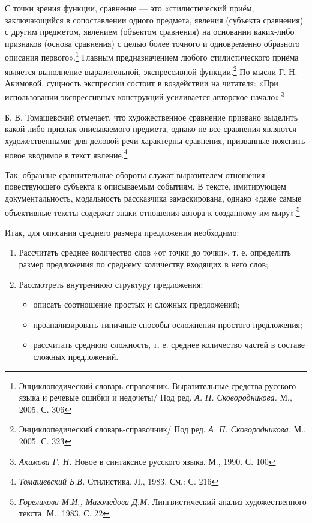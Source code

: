 \documentclass{kursa4}
\begin{document}
      С точки зрения функции, сравнение — это «стилистический приём, заключающийся в сопоставлении одного предмета, явления (субъекта сравнения) с другим предметом, явлением (объектом сравнения) на основании каких-либо признаков (основа сравнения) с целью более точного и одновременно образного описания первого».\footnote{Энциклопедический словарь-справочник. Выразительные средства русского языка и речевые ошибки и недочеты/ Под ред. \textit{А. П. Сковородникова.} М., 2005. С. 306} Главным предназначением любого стилистического приёма является выполнение выразительной, экспрессивной функции.\footnote{Энциклопедический словарь-справочник/ Под ред. \textit{А. П. Сковородникова.} М., 2005. С. 323} По мысли Г. Н. Акимовой, сущность экспрессии  состоит в воздействии на читателя: «При использовании экспрессивных конструкций усиливается авторское начало».\footnote{\textit{Акимова Г. Н.} Новое в синтаксисе русского языка. М., 1990. С. 100} 

      Б. В. Томашевский отмечает, что художественное сравнение призвано выделить какой-либо признак описываемого предмета, однако не все сравнения являются художественными: для деловой речи характерны сравнения, призванные  пояснить новое вводимое в текст явление.\footnote{\textit{Томашевский Б.В.} Стилистика. Л., 1983. См.: С. 216} 

      Так, образные сравнительные обороты служат выразителем отношения повествующего субъекта к описываемым событиям. В тексте, имитирующем документальность, модальность рассказчика замаскирована, однако «даже самые объективные тексты содержат знаки отношения автора к созданному им миру».\footnote{\textit{Гореликова М.И., Магомедова Д.М.} Лингвистический анализ художественного текста. М., 1983. С. 22}  

      Итак, для описания среднего размера предложения необходимо: 
      \begin{enumerate}
        \item Рассчитать среднее количество слов «от точки до точки», т. е. определить размер предложения по среднему количеству входящих в него слов; \item Рассмотреть внутреннюю структуру предложения: 
        \begin{itemize}
          \item описать соотношение простых и сложных предложений; \item проанализировать типичные способы осложнения простого предложения; \item рассчитать среднюю сложность, т. е. среднее количество частей в составе сложных предложений. \end{itemize}
      \end{enumerate}
\end{document}
